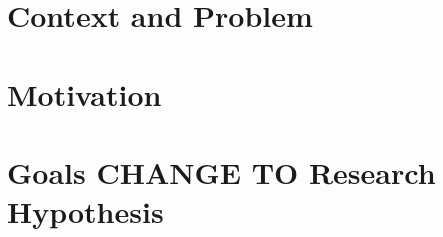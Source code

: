 %
%
%
%
%
\section{Context and Problem}
\section{Motivation}
\section{Goals CHANGE TO Research Hypothesis}

